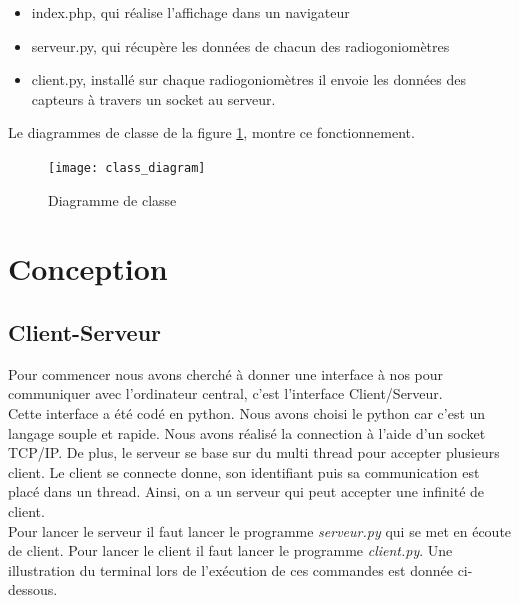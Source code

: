 \begin{itemize}
\item index.php, qui réalise l'affichage dans un navigateur
\item serveur.py, qui récupère les données de chacun des radiogoniomètres
\item client.py, installé sur chaque radiogoniomètres il envoie les données des capteurs à travers un socket au serveur.
\end{itemize}

Le diagrammes de classe de la figure \ref{fig:class}, montre ce fonctionnement.

\begin{figure}[!h]
  \centering
  \texttt{[image: class\_diagram]}
  \caption{Diagramme de classe}
  \label{fig:class}
\end{figure}



\section{Conception}

\subsection{Client-Serveur}

Pour commencer nous avons cherché à donner une interface à nos \rpi pour communiquer avec l'ordinateur central, c'est l'interface Client/Serveur.
~\\

Cette interface a été codé en python. Nous avons choisi le python car c'est un langage souple et rapide. Nous avons réalisé la connection à l'aide d'un socket TCP/IP. De plus, le serveur se base sur du multi thread pour accepter plusieurs client. Le client se connecte donne, son identifiant puis sa communication est placé dans un thread. Ainsi, on a un serveur qui peut accepter une infinité de client.
~\\

Pour lancer le serveur il faut lancer le programme \textit{serveur.py} qui se met en écoute de client. Pour lancer le client il faut lancer le programme \textit{client.py}. Une illustration du terminal lors de l'exécution de ces commandes est donnée ci-dessous.
~\\

